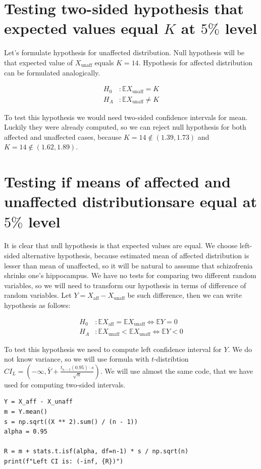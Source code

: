 \documentclass[12pt,a4paper]{article} %
\newcommand{\randv}[2][X]{#1_{\text{#2}}}
\newcommand{\E}{\mathbb{E}}
\begin{document}
\section{Testing two-sided hypothesis that expected values equal $K$ at $5\%$ level}

Let's formulate hypothesis for unaffected distribution. Null hypothesis will be that expected value of $\randv{unaff}$ equals $K = 14$. Hypothesis for affected distribution can be formulated analogically.

\begin{align*}
  H_0 &: \E\randv{unaff} = K \\
  H_A &: \E\randv{unaff} \neq K
\end{align*}

To test this hypothesis we would need two-sided confidence intervals for mean. Luckily they were already computed, so we can reject null hypothesis for both affected and unaffected cases, because $K = 14 \not\in (1.39, 1.73)$ and $K = 14 \not\in (1.62, 1.89)$.

\section{Testing if means of affected and unaffected distributionsare  equal at $5\%$ level}

It is clear that null hypothesis is that expected values are equal. We choose left-sided alternative hypothesis, because estimated mean of affected distribution is lesser than mean of unaffected, so it will be natural to asssume that schizofrenia shrinks one's hippocampus. We have no tests for comparing two different random variables, so we will need to transform our hypothesis in terms of difference of random variables. Let $Y = \randv{aff} - \randv{unaff}$ be such difference, then we can write hypothesis as follows:

\begin{align*}
  H_0 &: \E\randv{aff} = \E\randv{unaff} \iff \E Y = 0\\
  H_A &: \E\randv{unaff} < \E\randv{unaff} \iff \E Y < 0
\end{align*}

To test this hypothesis we need to compute left confidence interval for $Y$. We do not know variance, so we will use formula with $t$-distribtion $CI_L = (-\infty, \bar Y + \frac{t_{n-1}(0.95) \cdot s}{\sqrt{n}})$. We will use almost the same code, that we have used for computing two-sided intervals.

\begin{lstlisting}
Y = X_aff - X_unaff
m = Y.mean()
s = np.sqrt((X ** 2).sum() / (n - 1))
alpha = 0.95

R = m + stats.t.isf(alpha, df=n-1) * s / np.sqrt(n)
print(f"Left CI is: (-inf, {R})")
\end{lstlisting}
\end{document}
